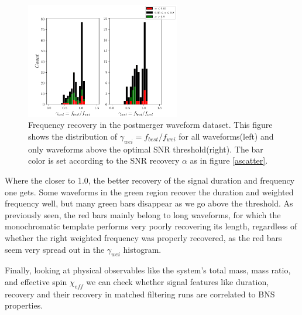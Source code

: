 \begin{figure}[hbt!]
\begin{center}
\includegraphics[width=0.6\textwidth, angle=0]{images/Data_analysis/results/alpha_gammahist.pdf}
\captionsetup{width=0.8\textwidth}
\caption[Frequency recovery in the postmerger waveform dataset]{Frequency recovery in the postmerger waveform dataset. This figure shows the distribution of $\gamma_{wei}=f_{best}/f_{wei}$ for all waveforms(left) and only waveforms above the optimal SNR threshold(right). The bar color is set according to the SNR recovery $\alpha$ as in figure \ref{ascatter}.}
\label{aghist}
\end{center}
\end{figure}
\FloatBarrier

Where the closer to 1.0, the better recovery of the signal duration and frequency one gets. Some waveforms in the green region recover the duration and weighted frequency well, but many green bars disappear as we go above the threshold. As previously seen, the red bars mainly belong to long waveforms, for which the monochromatic template performs very poorly recovering its length, regardless of whether the right weighted frequency was properly recovered, as the red bars seem very spread out in the $\gamma_{wei}$ histogram. 

\newpage

Finally, looking at physical observables like the system's total mass, mass ratio, and effective spin $\chi_{eff}$ we can check whether signal features like duration, recovery and their recovery in matched filtering runs are correlated to BNS properties.  

